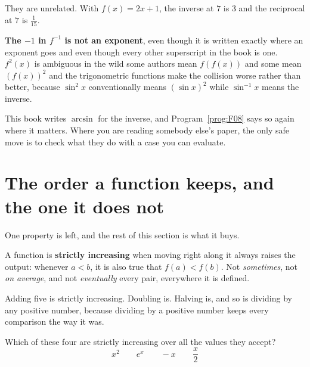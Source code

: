 \begin{fr}
They are unrelated. With $f(x) = 2x + 1$, the inverse at $7$ is $3$ and the
reciprocal at $7$ is $\frac{1}{15}$.

\begin{trapbox}
\textbf{The $-1$ in $f^{-1}$ is not an exponent}, even though it is written
exactly where an exponent goes and even though every other superscript in the
book is one. $f^{2}(x)$ is ambiguous in the wild \dash{} some authors mean
$f(f(x))$ and some mean $(f(x))^{2}$ \dash{} and the trigonometric functions
make the collision worse rather than better, because $\sin^{2}x$ conventionally
means $(\sin x)^{2}$ while $\sin^{-1}x$ means the inverse.

This book writes $\arcsin$ for the inverse, and Program~\ref{prog:F08} says so
again where it matters. Where you are reading somebody else's paper, the only
safe move is to check what they do with a case you can evaluate.
\end{trapbox}
\end{fr}

\section{The order a function keeps, and the one it does not}
\label{sec:F05-monotone}

\begin{fr}
One property is left, and the rest of this section is what it buys.

A function is \textbf{strictly increasing} when moving right along it always
raises the output: whenever $a < b$, it is also true that $f(a) < f(b)$. Not
\emph{sometimes}, not \emph{on average}, and not \emph{eventually} \dash{}
every pair, everywhere it is defined.

Adding five is strictly increasing. Doubling is. Halving is, and so is dividing
by any positive number, because dividing by a positive number keeps every
comparison the way it was.

Which of these four are strictly increasing over all the values they accept?
\[ x^{2} \qquad e^{x} \qquad -x \qquad \frac{x}{2} \]
\dotline
\nextframe
\end{fr}

